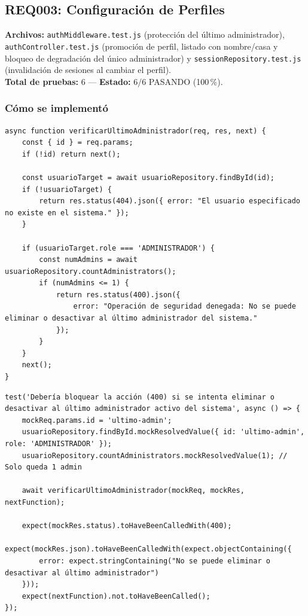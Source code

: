 \documentclass[12pt,a4paper]{article}
\begin{document}
\subsection{REQ003: Configuración de Perfiles}
\textbf{Archivos:} \texttt{authMiddleware.test.js} (protección del último administrador),
\texttt{authController.test.js} (promoción de perfil, listado con nombre/casa y bloqueo de
degradación del único administrador) y \texttt{sessionRepository.test.js} (invalidación de
sesiones al cambiar el perfil).\\
\textbf{Total de pruebas:} 6 — \textbf{Estado:} 6/6 PASANDO (100\,\%).

\subsubsection*{Cómo se implementó}

\begin{lstlisting}[caption={\texttt{verificarUltimoAdministrador} (\texttt{authMiddleware.js})}]
async function verificarUltimoAdministrador(req, res, next) {
    const { id } = req.params;
    if (!id) return next();

    const usuarioTarget = await usuarioRepository.findById(id);
    if (!usuarioTarget) {
        return res.status(404).json({ error: "El usuario especificado no existe en el sistema." });
    }

    if (usuarioTarget.role === 'ADMINISTRADOR') {
        const numAdmins = await usuarioRepository.countAdministrators();
        if (numAdmins <= 1) {
            return res.status(400).json({
                error: "Operación de seguridad denegada: No se puede eliminar o desactivar al último administrador del sistema."
            });
        }
    }
    next();
}
\end{lstlisting}

\begin{lstlisting}[caption={Prueba del bloqueo al último administrador activo (\texttt{authMiddleware.test.js})}]
test('Debería bloquear la acción (400) si se intenta eliminar o desactivar al último administrador activo del sistema', async () => {
    mockReq.params.id = 'ultimo-admin';
    usuarioRepository.findById.mockResolvedValue({ id: 'ultimo-admin', role: 'ADMINISTRADOR' });
    usuarioRepository.countAdministrators.mockResolvedValue(1); // Solo queda 1 admin

    await verificarUltimoAdministrador(mockReq, mockRes, nextFunction);

    expect(mockRes.status).toHaveBeenCalledWith(400);
    expect(mockRes.json).toHaveBeenCalledWith(expect.objectContaining({
        error: expect.stringContaining("No se puede eliminar o desactivar al último administrador")
    }));
    expect(nextFunction).not.toHaveBeenCalled();
});
\end{lstlisting}
\end{document}
